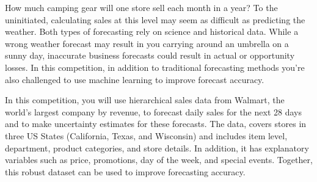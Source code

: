 \documentclass[11pt]{article}
\begin{document}
How much camping gear will one store sell each month in a year? To the uninitiated, calculating sales at this level may seem as difficult as predicting the weather. Both types of forecasting rely on science and historical data. While a wrong weather forecast may result in you carrying around an umbrella on a sunny day, inaccurate business forecasts could result in actual or opportunity losses. In this competition, in addition to traditional forecasting methods you're also challenged to use machine learning to improve forecast accuracy.

In this competition, you will use hierarchical sales data from Walmart, the world's largest company by revenue, to forecast daily sales for the next 28 days and to make uncertainty estimates for these forecasts. The data, covers stores in three US States (California, Texas, and Wisconsin) and includes item level, department, product categories, and store details. In addition, it has explanatory variables such as price, promotions, day of the week, and special events. Together, this robust dataset can be used to improve forecasting accuracy. 
\end{document}
